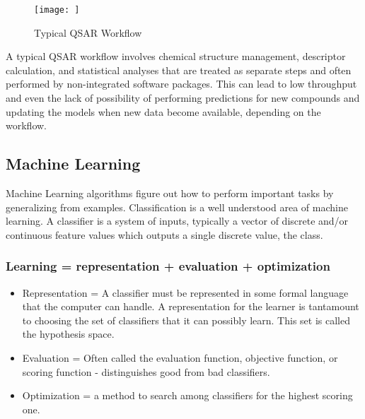 \begin{figure}[h,t]
  \caption{Typical QSAR Workflow}
  \centering
   \texttt{[image: ]}
\end{figure}

A typical QSAR workflow involves chemical structure management, descriptor calculation, and statistical analyses that are treated as separate steps and often performed by non-integrated software packages. This can lead to low throughput and even the lack of possibility of performing predictions for new compounds and updating the models when new data become available, depending on the workflow.





\subsection{Machine Learning}

Machine Learning algorithms figure out how to perform important tasks by generalizing from examples. Classification is a well understood area of machine learning. A classifier is a system of inputs, typically a vector of discrete and/or continuous feature values which outputs a single discrete value, the class.\cite{Domingos2012}

\subsubsection*{Learning = representation + evaluation + optimization}

\begin{itemize}
\item Representation = A classifier must be represented in some formal language that the computer can handle. A representation for the learner is tantamount to choosing the set of classifiers that it can possibly learn. This set is called the hypothesis space.

\item Evaluation = Often called the evaluation function, objective function, or scoring function - distinguishes good from bad classifiers.

\item Optimization = a method to search among classifiers for the highest scoring one.

\end{itemize}

